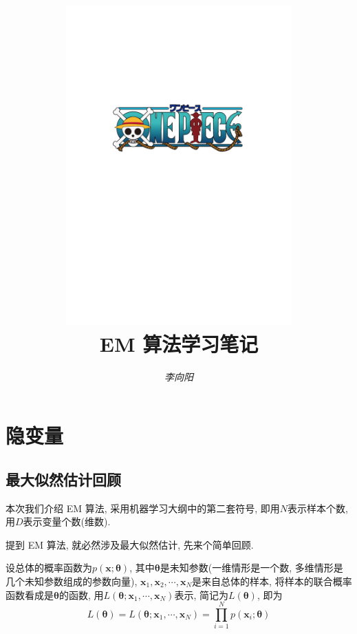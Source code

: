 \documentclass[a4paper,UTF8]{ctexart}
\theoremstyle{plain} \newtheorem{theorem}{定理}[section]
\theoremstyle{plain} \newtheorem{definition}{定义}[section]
\theoremstyle{plain} \newtheorem{lemma}{引理}[section]
\theoremstyle{plain} \newtheorem{proposition}{命题}[section]
\theoremstyle{plain} \newtheorem{example}{例}
\theoremstyle{plain} \newtheorem{remark}{注}
\theoremstyle{plain} \newtheorem{corollary}{推论}[section]
\begin{document}
\title{
\includegraphics[width=0.65\textwidth]{onepiece.pdf}\\
\vspace{2em}
\textbf{EM 算法学习笔记}}
\author{\emph{李向阳} \quad \color{blue}{d1142845997@gmail.com}}
\date{}


\maketitle
\thispagestyle{empty}

\newpage


\tableofcontents

\newpage

\section{隐变量}
\subsection{最大似然估计回顾}
本次我们介绍 EM 算法, 采用机器学习大纲中的第二套符号, 即用$N$表示样本个数, 用$D$表示变量个数(维数).

提到 EM 算法, 就必然涉及最大似然估计, 先来个简单回顾.

设总体的概率函数为$p(\bm{x}; \bm{\theta})$, 其中$\bm{\theta}$是未知参数(一维情形是一个数, 多维情形是几个未知参数组成的参数向量), $\bm{x}_{1}, \bm{x}_{2}, \cdots, \bm{x}_{N}$是来自总体的样本, 将样本的联合概率函数看成是$\bm{\theta}$的函数, 用$L(\bm{\theta}; \bm{x}_{1}, \cdots, \bm{x}_{N})$表示, 简记为$L(\bm{\theta})$, 即为
\begin{equation*}
L(\bm{\theta}) = L(\bm{\theta}; \bm{x}_{1},\cdots,\bm{x}_{N}) = \prod_{i=1}^{N} p(\bm{x}_{i}; \bm{\theta})
\end{equation*}
\end{document}
